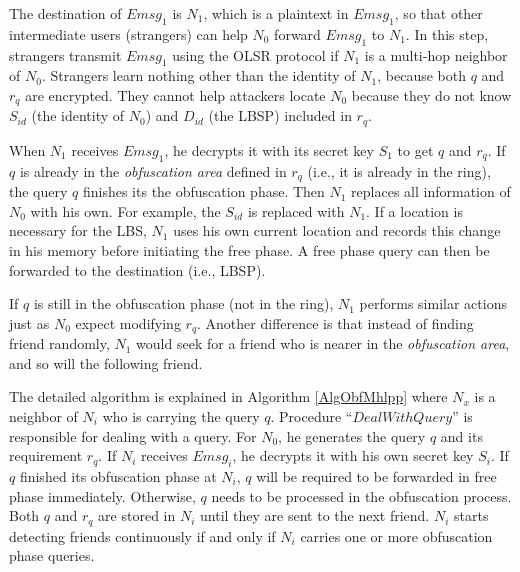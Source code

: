 The destination of ${Emsg}_1$ is ${N}_1$, which is a plaintext in ${Emsg}_1$, so that other intermediate users (strangers) can help $N_0$ forward ${Emsg}_1$ to ${N}_1$. In this step, strangers transmit ${Emsg}_1$ using the OLSR protocol if ${N}_1$ is a multi-hop neighbor of $N_0$. Strangers learn nothing other than the identity of ${N}_1$, because both $q$ and $r_q$ are encrypted. They cannot help attackers locate $N_0$ because they do not know ${S}_{id}$ (the identity of $N_0$) and ${D}_{id}$ (the LBSP) included in $r_q$.

When ${N}_1$ receives ${Emsg}_1$, he decrypts it with its secret key ${S}_{1}$ to get $q$ and $r_q$. If $q$ is already in the \textit{obfuscation area} defined in ${r}_{q}$ (i.e., it is already in the ring), the query $q$ finishes its the obfuscation phase. Then ${N}_1$ replaces all information of $N_0$ with his own. For example, the ${S}_{id}$ is replaced with ${N}_1$. If a location is necessary for the LBS, ${N}_1$ uses his own current location and records this change in his memory before initiating the free phase. A free phase query can then be forwarded to the destination (i.e., LBSP). 

If $q$ is still in the obfuscation phase (not in the ring), ${N}_1$ performs similar actions just as $N_0$ expect modifying $r_q$. Another difference is that instead of finding friend randomly, ${N}_{1}$ would seek for a friend who is nearer in the \textit{obfuscation area}, and so will the following friend. 

The detailed algorithm is explained in Algorithm \ref{AlgObfMhlpp} where ${N}_{x}$ is a neighbor of ${N}_{i}$ who is carrying the query $q$. Procedure ``$DealWithQuery$'' is responsible for dealing with a query. For $N_0$, he generates the query $q$ and its requirement $r_q$. If ${N}_{i}$ receives ${Emsg}_{i}$, he decrypts it with his own secret key ${S}_{i}$. If $q$ finished its obfuscation phase at ${N}_{i}$, $q$ will be required to be forwarded in free phase immediately. Otherwise, $q$ needs to be processed in the obfuscation process. Both $q$ and $r_q$ are stored in ${N}_{i}$ until they are sent to the next friend. ${N}_{i}$ starts detecting friends continuously if and only if ${N}_{i}$ carries one or more obfuscation phase queries. 

